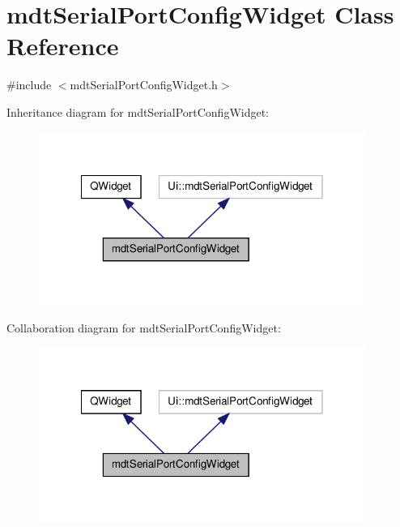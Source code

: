 \hypertarget{classmdt_serial_port_config_widget}{\section{mdt\-Serial\-Port\-Config\-Widget Class Reference}
\label{classmdt_serial_port_config_widget}
}


{\ttfamily \#include $<$mdt\-Serial\-Port\-Config\-Widget.\-h$>$}



Inheritance diagram for mdt\-Serial\-Port\-Config\-Widget\-:
\nopagebreak
\begin{figure}[H]
\begin{center}
\leavevmode
\includegraphics[width=302pt]{classmdt_serial_port_config_widget__inherit__graph}
\end{center}
\end{figure}


Collaboration diagram for mdt\-Serial\-Port\-Config\-Widget\-:
\nopagebreak
\begin{figure}[H]
\begin{center}
\leavevmode
\includegraphics[width=302pt]{classmdt_serial_port_config_widget__coll__graph}
\end{center}
\end{figure}
